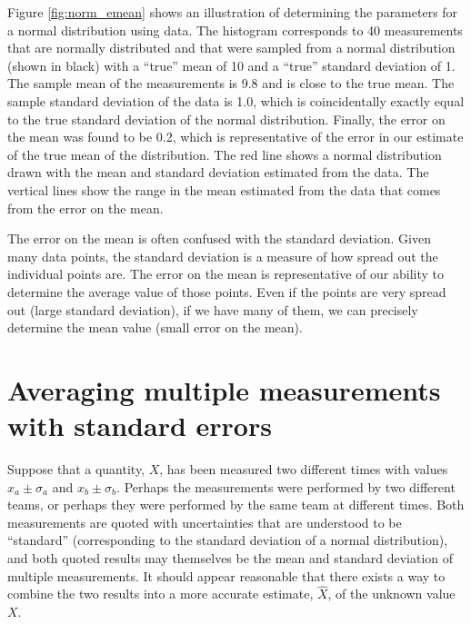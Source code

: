 Figure \ref{fig:norm_emean} shows an illustration of determining the parameters for a normal distribution using data. The histogram corresponds to 40 measurements that are normally distributed and that were sampled from a normal distribution (shown in black) with a ``true'' mean of 10 and a ``true'' standard deviation of 1. The sample mean of the measurements is 9.8 and is close to the true mean. The sample standard deviation of the data is 1.0, which is coincidentally exactly equal to the true standard deviation of the normal distribution. Finally, the error on the mean was found to be 0.2, which is representative of the error in our estimate of the true mean of the distribution. The red line shows a normal distribution drawn with the mean and standard deviation estimated from the data. The vertical lines show the range in the mean estimated from the data that comes from the error on the mean.

The error on the mean is often confused with the standard deviation. Given many data points, the standard deviation is a measure of how spread out the individual points are. The error on the mean is representative of our ability to determine the average value of those points. Even if the points are very spread out (large standard deviation), if we have many of them, we can precisely determine the mean value (small error on the mean).
 


\section{Averaging multiple measurements with standard errors}

Suppose that a quantity, $X$, has been measured two different times with values $x_a\pm\sigma_a$ and $x_b\pm \sigma_b$. Perhaps the measurements were performed by two different teams, or perhaps they were performed by the same team at different times. Both measurements are quoted with uncertainties that are understood to be ``standard'' (corresponding to the standard deviation of a normal distribution), and both quoted results may themselves be the mean and standard deviation of multiple measurements. It should appear reasonable that there exists a way to combine the two results into a more accurate estimate, $\hat X$, of the unknown value $X$. 

